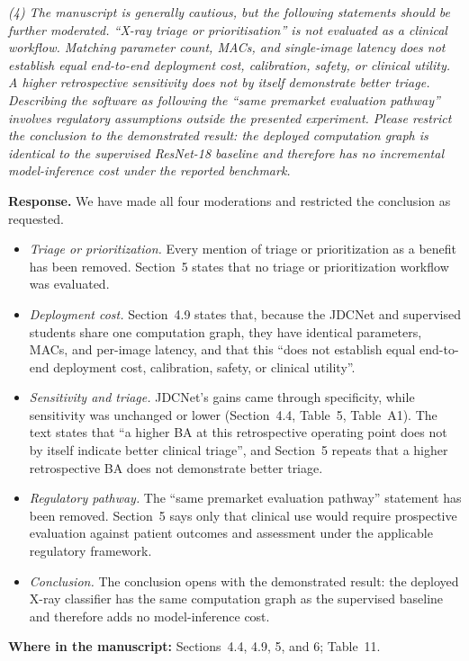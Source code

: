 \documentclass[11pt]{article}
\newenvironment{rcomment}{\par\noindent\begin{minipage}{\linewidth}\itshape\color{black!75}}{\end{minipage}\par}
\newcommand{\where}[1]{\par\noindent\textbf{Where in the manuscript:} #1\par}
\begin{document}
\begin{rcomment}
(4) The manuscript is generally cautious, but the following statements should be further moderated. ``X-ray triage or prioritisation'' is not evaluated as a clinical workflow. Matching parameter count, MACs, and single-image latency does not establish equal end-to-end deployment cost, calibration, safety, or clinical utility. A higher retrospective sensitivity does not by itself demonstrate better triage. Describing the software as following the ``same premarket evaluation pathway'' involves regulatory assumptions outside the presented experiment. Please restrict the conclusion to the demonstrated result: the deployed computation graph is identical to the supervised ResNet-18 baseline and therefore has no incremental model-inference cost under the reported benchmark.
\end{rcomment}

\textbf{Response.} We have made all four moderations and restricted the
conclusion as requested.
\begin{itemize}[leftmargin=1.4em]
  \item \emph{Triage or prioritization.} Every mention of triage or prioritization as a benefit has been removed. Section~5 states that no triage or prioritization workflow was evaluated.
  \item \emph{Deployment cost.} Section~4.9 states that, because the JDCNet and supervised students share one computation graph, they have identical parameters, MACs, and per-image latency, and that this ``does not establish equal end-to-end deployment cost, calibration, safety, or clinical utility''.
  \item \emph{Sensitivity and triage.} JDCNet's gains came through specificity, while sensitivity was unchanged or lower (Section~4.4, Table~5, Table~A1). The text states that ``a higher BA at this retrospective operating point does not by itself indicate better clinical triage'', and Section~5 repeats that a higher retrospective BA does not demonstrate better triage.
  \item \emph{Regulatory pathway.} The ``same premarket evaluation pathway'' statement has been removed. Section~5 says only that clinical use would require prospective evaluation against patient outcomes and assessment under the applicable regulatory framework.
  \item \emph{Conclusion.} The conclusion opens with the demonstrated result: the deployed X-ray classifier has the same computation graph as the supervised baseline and therefore adds no model-inference cost.
\end{itemize}
\where{Sections~4.4, 4.9, 5, and 6; Table~11.}
\end{document}
